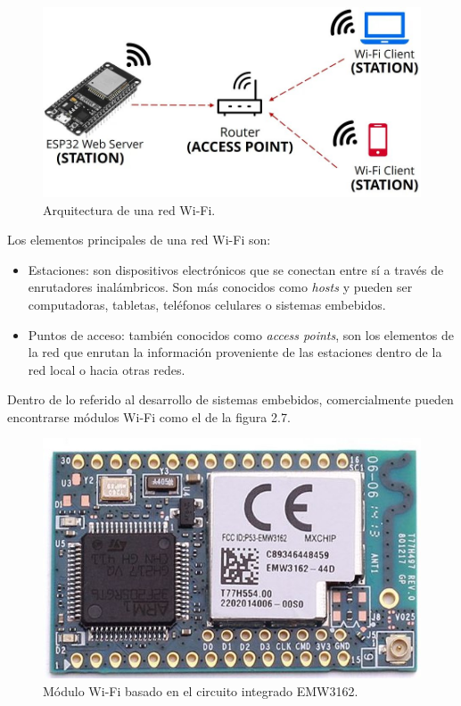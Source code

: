 \begin{figure}[h]
	\centering
	\includegraphics[scale=0.4]{./Figures/wifi_architecture.jpg}
	\caption{Arquitectura de una red Wi-Fi\protect\footnotemark.}
	\label{fig:cuadradoAzul}
\end{figure}


Los elementos principales de una red Wi-Fi son:
\begin{itemize}
	\item Estaciones: son dispositivos electrónicos que se conectan entre sí a través de enrutadores inalámbricos. Son más conocidos como \textit{hosts} y pueden ser computadoras, tabletas, teléfonos celulares o sistemas embebidos.
	\item Puntos de acceso: también conocidos como \textit{access points}, son los elementos de la red que enrutan la información proveniente de las estaciones dentro de la red local o hacia otras redes.
\end{itemize}

Dentro de lo referido al desarrollo de sistemas embebidos, comercialmente pueden encontrarse módulos Wi-Fi como el de la figura 2.7.

\begin{figure}[h]
	\centering
	\includegraphics[scale=0.3]{./Figures/wifi_module.jpg}
	\caption{Módulo Wi-Fi basado en el circuito integrado EMW3162\protect\footnotemark.}
	\label{fig:cuadradoAzul}
\end{figure}

